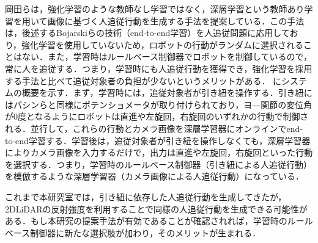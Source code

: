   岡田ら\cite{okada}は，強化学習のような教師なし学習ではなく，深層学習\cite{yann2}という教師あり学習を用いて画像に基づく人追従行動を生成する手法を提案している．この手法は，後述するBojarskiら\cite{bojarski}の技術（end-to-end学習）を人追従問題に応用しており，強化学習を使用していないため，ロボットの行動がランダムに選択されることはない．また，学習時はルールベース制御器でロボットを制御しているので，常に人を追従する．つまり，学習時にも人追従行動を獲得でき，強化学習を採用する手法と比べて追従対象者の負担が少ないというメリットがある．
  にシステムの概要を示す．まず，学習時には，追従対象者が引き紐を操作する．引き紐にはパシンらと同様にポテンショメータが取り付けられており，ヨ―関節の変位角が0度となるようにロボットは直進や左旋回，右旋回のいずれかの行動で制御される．並行して，これらの行動とカメラ画像を深層学習器にオンラインでend-to-end学習する．学習後は，追従対象者が引き紐を操作しなくても，深層学習器によりカメラ画像を入力するだけで，出力は直進や左旋回，右旋回といった行動を選択する．つまり，学習時のルールベース制御器（引き紐による人追従行動）を模倣するような深層学習器（カメラ画像による人追従行動）になっている．

  これまで本研究室では，引き紐に依存した人追従行動を生成してきたが，2DLiDARの反射強度を利用することで同様の人追従行動を生成できる可能性がある．もし本研究の提案手法が有効であることが確認されれば，学習時のルールベース制御器に新たな選択肢が加わり，そのメリットが生まれる．

\newpage

